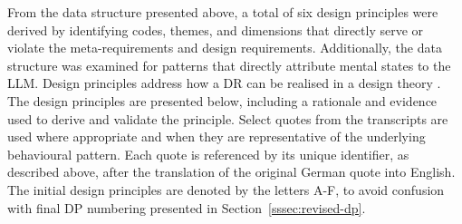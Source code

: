 From the data structure presented above, a total of six design principles were derived by identifying codes, themes, and dimensions that directly serve or violate the meta-requirements and design requirements. Additionally, the data structure was examined for patterns that directly attribute mental states to the \ac{LLM}. Design principles address how a \ac{DR} can be realised in a design theory \parencite{Herm2022}. The design principles are presented below, including a rationale and evidence used to derive and validate the principle. Select quotes from the transcripts are used where appropriate and when they are representative of the underlying behavioural pattern. Each quote is referenced by its unique identifier, as described above, after the translation of the original German quote into English. The initial design principles are denoted by the letters A-F, to avoid confusion with final \ac{DP} numbering presented in Section~\ref{sssec:revised-dp}.


